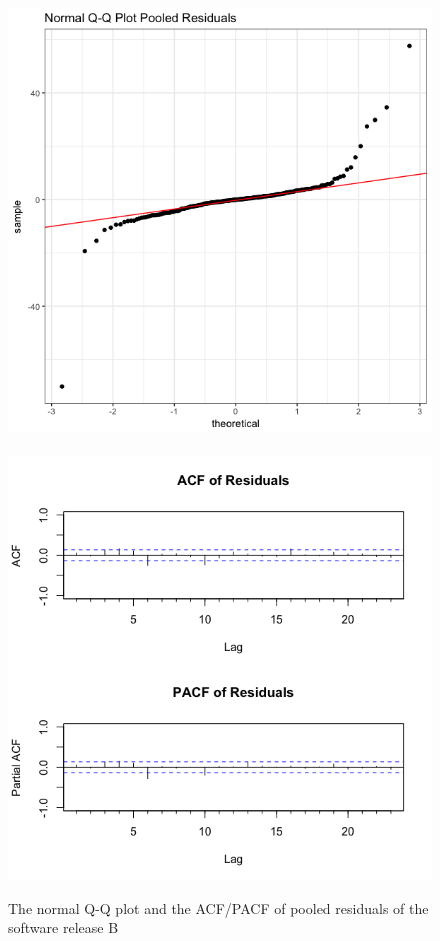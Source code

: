 \begin{figure}[H]
\begin{centering}
\includegraphics[scale=0.3]{picture/L16B_QQPool}$\quad$\includegraphics[scale=0.3]{picture/L16B_ACFPool}
\par\end{centering}
\caption{The normal Q-Q plot and the ACF/PACF of pooled residuals of the software
release B}
\label{L16B_plotDiag}
\end{figure}


